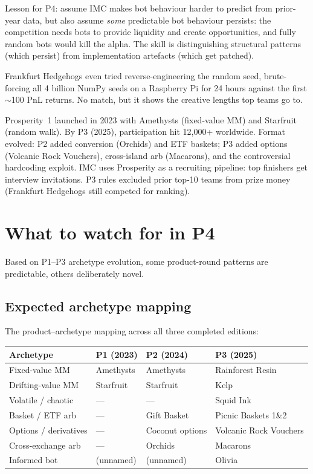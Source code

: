 Lesson for P4: assume IMC makes bot behaviour harder to predict
from prior-year data, but also assume \emph{some} predictable bot
behaviour persists: the competition needs bots to provide
liquidity and create opportunities, and fully random bots would kill
the alpha.  The skill is distinguishing structural patterns (which
persist) from implementation artefacts (which get patched).

Frankfurt Hedgehogs even tried reverse-engineering the random
seed, brute-forcing all 4 billion NumPy seeds on a Raspberry Pi
for 24 hours against the first $\sim$100 PnL returns.  No match,
but it shows the creative lengths top teams go to.

\begin{historybox}
Prosperity~1 launched in 2023 with Amethysts (fixed-value MM) and
Starfruit (random walk).  By P3 (2025), participation hit 12{,}000+
worldwide.  Format evolved: P2 added conversion (Orchids) and ETF
baskets; P3 added options (Volcanic Rock Vouchers), cross-island
arb (Macarons), and the controversial hardcoding exploit.  IMC
uses Prosperity as a recruiting pipeline: top finishers get
interview invitations.  P3 rules excluded prior top-10 teams from
prize money (Frankfurt Hedgehogs still competed for ranking).
\end{historybox}


\section{What to watch for in P4}
\label{sec:p4_watch}

Based on P1--P3 archetype evolution, some product-round patterns
are predictable, others deliberately novel.

\subsection{Expected archetype mapping}

The product--archetype mapping across all three completed
editions:

\begin{center}
\small
\begin{tabular}{@{}llll@{}}
\toprule
\textbf{Archetype} & \textbf{P1 (2023)} & \textbf{P2 (2024)}
  & \textbf{P3 (2025)} \\
\midrule
Fixed-value MM & Amethysts & Amethysts & Rainforest Resin \\
Drifting-value MM & Starfruit & Starfruit & Kelp \\
Volatile / chaotic & --- & --- & Squid Ink \\
Basket / ETF arb & --- & Gift Basket & Picnic Baskets 1\&2 \\
Options / derivatives & --- & Coconut options
  & Volcanic Rock Vouchers \\
Cross-exchange arb & --- & Orchids & Macarons \\
Informed bot & (unnamed) & (unnamed) & Olivia \\
\bottomrule
\end{tabular}
\end{center}

